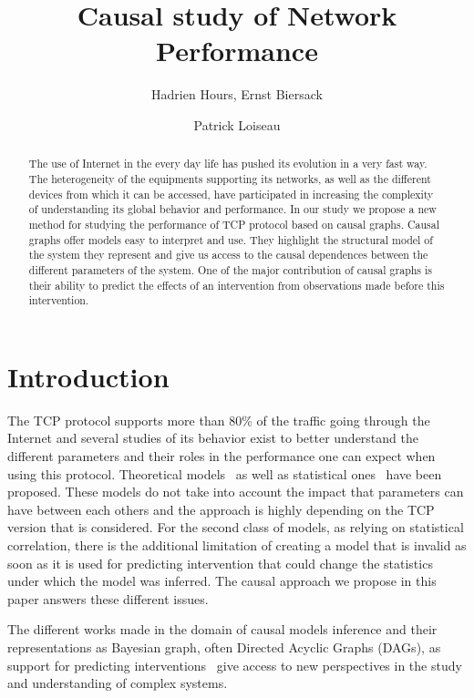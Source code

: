 \documentclass[]{algotel}
\author{Hadrien Hours\addressmark{1}, Ernst Biersack\addressmark{1} \and Patrick Loiseau\addressmark{1}}
\title[Causal study of network performance]{Causal study of Network Performance}
\begin{document}
\maketitle

\begin{abstract}
The use of Internet in the every day life has pushed its evolution in a very fast way. The heterogeneity of the equipments supporting its networks, as well as the different devices from which it can be accessed, have participated in increasing the complexity of understanding its global behavior and performance. In our study we propose a new method for studying the performance of TCP protocol based on causal graphs. Causal graphs offer models easy to interpret and use. They highlight the structural model of the system they represent and give us access to the causal dependences between the different parameters of the system. One of the major contribution of causal graphs is their ability to predict the effects of an intervention from observations made before this intervention.

\end{abstract}

\section{Introduction}
\label{sec:in}
The TCP protocol supports more than 80\% of the traffic going through the Internet and several studies of its behavior exist to better understand the different parameters and their roles in the performance one can expect when using this protocol. Theoretical models~\cite{Padhye:1998:MTT:285243.285291} as well as statistical ones~\cite{Mirza:2007:MLA:1254882.1254894} have been proposed. These models do not take into account the impact that parameters can have between each others and the approach is highly depending on the TCP version that is considered. For the second class of models, as relying on statistical correlation, there is the additional limitation of creating a model that is invalid as soon as it is used for predicting intervention that could change the statistics under which the model was inferred. The causal approach we propose in this paper answers these different issues.

The different works made in the domain of causal models inference and their representations as Bayesian graph, often Directed Acyclic Graphs (DAGs), as support for predicting interventions~\cite{PearlJ2000,citeulike:487589} give access to new perspectives in the study and understanding of complex systems.
\end{document}
